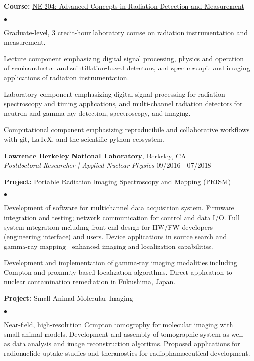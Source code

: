 \documentclass[margin,line]{res}
\newenvironment{list1}{
  \begin{list}{\ding{113}}{%
      \setlength{\itemsep}{0in}
      \setlength{\parsep}{0in} \setlength{\parskip}{0in}
      \setlength{\topsep}{0in} \setlength{\partopsep}{0in} 
      \setlength{\leftmargin}{0.17in}}}{\end{list}}
\newenvironment{list2}{
  \begin{list}{$\bullet$}{%
      \setlength{\itemsep}{0in}
      \setlength{\parsep}{0in} \setlength{\parskip}{0in}
      \setlength{\topsep}{0in} \setlength{\partopsep}{0in} 
      \setlength{\leftmargin}{0.2in}}}{\end{list}}
\begin{document}
\begin{resume}
\begin{list1}
  \item[] {\bf \small Course:} \href{https://ne204-fall2018.github.io}{NE 204: Advanced Concepts in Radiation
Detection and Measurement}
  \begin{list2}
    \item Graduate-level, 3 credit-hour laboratory course on radiation
          instrumentation and measurement.
    \item Lecture component emphasizing digital signal processing, physics and
          operation of semiconductor and scintillation-based detectors, and
          spectroscopic and imaging applications of radiation instrumentation.
    \item Laboratory component emphasizing digital signal processing for
          radiation spectroscopy and timing applications, and multi-channel
          radiation detectors for neutron and gamma-ray detection, spectroscopy,
          and imaging.
    \item Computational component emphasizing reproducibile and collaborative
          workflows with git, \LaTeX, and the scientific python ecosystem. 
  \end{list2}
\end{list1}

{\bf Lawrence Berkeley National Laboratory}, Berkeley, CA \\
{\em Postdoctoral Researcher | Applied Nuclear Physics} \hfill 09/2016 - 07/2018

\begin{list1}
  \item[] {\bf \small Project:} Portable Radiation Imaging Spectroscopy and Mapping (PRISM)
  \begin{list2}
    \item Development of software for multichannel data acquisition system.
          Firmware integration and testing; network communication for control
          and data I/O.
          Full system integration including front-end design for HW/FW
          developers (engineering interface) and users.
          Device applications in source search and gamma-ray mapping | 
          enhanced imaging and localization capabilities.
    \item Development and implementation of gamma-ray imaging modalities
          including Compton and proximity-based localization algorithms.
          Direct application to nuclear contamination remediation in 
          Fukushima, Japan.
  \end{list2}
  \item[] {\bf \small Project:} Small-Animal Molecular Imaging
  \begin{list2}
    \item Near-field, high-resolution Compton tomography for molecular imaging
          with small-animal models.
          Development and assembly of tomographic system as well as data 
          analysis and image reconstruction algoritms.
          Proposed applications for radionuclide uptake studies and theranostics
          for radiophamaceutical development.
  \end{list2}
\end{list1}


\end{resume}
\end{document}
